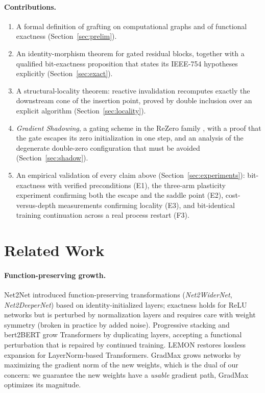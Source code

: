 \documentclass[11pt,a4paper]{article}
\begin{document}
\paragraph{Contributions.}
\begin{enumerate}
    \item A formal definition of grafting on computational graphs and of functional exactness (Section~\ref{sec:prelim}).
    \item An identity-morphism theorem for gated residual blocks, together with a qualified bit-exactness proposition that states its IEEE-754 hypotheses explicitly (Section~\ref{sec:exact}).
    \item A structural-locality theorem: reactive invalidation recomputes exactly the downstream cone of the insertion point, proved by double inclusion over an explicit algorithm (Section~\ref{sec:locality}).
    \item \emph{Gradient Shadowing}, a gating scheme in the ReZero family \cite{rezero}, with a proof that the gate escapes its zero initialization in one step, and an analysis of the degenerate double-zero configuration that must be avoided (Section~\ref{sec:shadow}).
    \item An empirical validation of every claim above (Section~\ref{sec:experiments}): bit-exactness with verified preconditions (E1), the three-arm plasticity experiment confirming both the escape and the saddle point (E2), cost-versus-depth measurements confirming locality (E3), and bit-identical training continuation across a real process restart (F3).
\end{enumerate}

\section{Related Work}
\label{sec:related}

\paragraph{Function-preserving growth.} Net2Net \cite{net2net} introduced function-preserving transformations (\emph{Net2WiderNet}, \emph{Net2DeeperNet}) based on identity-initialized layers; exactness holds for ReLU networks but is perturbed by normalization layers and requires care with weight symmetry (broken in practice by added noise). Progressive stacking \cite{stacking} and bert2BERT \cite{bert2bert} grow Transformers by duplicating layers, accepting a functional perturbation that is repaired by continued training. LEMON \cite{lemon} restores lossless expansion for LayerNorm-based Transformers. GradMax \cite{gradmax} grows networks by maximizing the gradient norm of the new weights, which is the dual of our concern: we guarantee the new weights have a \emph{usable} gradient path, GradMax optimizes its magnitude.
\end{document}
